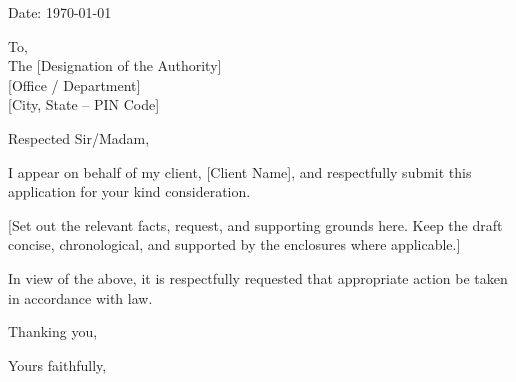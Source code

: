 
\noindent\hfill Date: \today\par
\PrintReferenceNo

\noindent
To,\\
The [Designation of the Authority]\\
{[Office / Department]}\\
{[City, State -- PIN Code]}

\PrintSubject

\noindent Respected Sir/Madam,

I appear on behalf of my client, [Client Name], and respectfully submit this application for your kind consideration.

    {[Set out the relevant facts, request, and supporting grounds here. Keep the draft concise, chronological, and supported by the enclosures where applicable.]}

In view of the above, it is respectfully requested that appropriate action be taken in accordance with law.

\noindent Thanking you,

\noindent Yours faithfully,

\vspace{1.5cm}
\noindent\textbf{\AdvocateName}\\
\AdvocateDesignation

\PrintEnclosures
